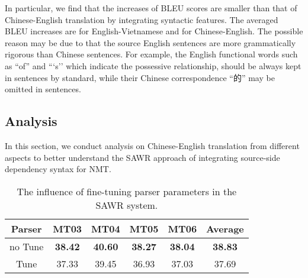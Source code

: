\documentclass[11pt,a4paper]{article}
\begin{document}
\begin{CJK}{UTF8}{gbsn}
In particular, we find that the increases of BLEU scores are smaller than that of Chinese-English translation
by integrating syntactic features.
The averaged BLEU increases are  for English-Vietnamese
and  for Chinese-English.
The possible reason may be due to that the source English sentences are more grammatically rigorous than Chinese sentences.
For example, the English functional words such as ``of'' and ```s''
which indicate the possessive relationship,  should be always kept in sentences by standard,
while their Chinese correspondence ``的'' may be omitted in sentences.








\subsection{Analysis}

In this section, we conduct analysis on Chinese-English translation from different aspects
to better understand the SAWR approach of integrating source-side dependency syntax for NMT.



\setlength{\tabcolsep}{3.0pt}
\begin{table}[t]
	\begin{center}
\begin{tabular}{c|cccc|c}
				\hline
				Parser &  MT03  & MT04  & MT05  & MT06 & Average \\ \hline
				no Tune & \bf 38.42  &   \bf 40.60  &  \bf 38.27  &  \bf 38.04   & \bf 38.83 \\
				Tune & 37.33 & 39.45 & 36.93 & 37.03 & 37.69   \\ \hline
\end{tabular}
			\caption{The influence of fine-tuning parser parameters in the SAWR system. }
			\label{table:analyze:tune}
\end{center}
\end{table}


\end{CJK}
\end{document}
